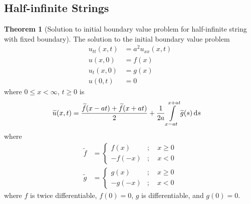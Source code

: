 \documentclass[titlepage, fleqn, a4paper, 12pt, twoside]{article}
\theoremstyle{definition}
\theoremstyle{theorem}
\newtheorem{theorem}{Theorem}
\renewcommand{\tilde}{\widetilde}
\begin{document}
\subsection{Half-infinite Strings}

\begin{theorem}[Solution to initial boundary value problem for half-infinite string with fixed boundary]
	The solution to the initial boundary value problem
	\begin{align*}
		u_{t t}(x,t) & = a^2 u_{x x}(x,t) \\
		u(x,0)       & = f(x)             \\
		u_t(x,0)     & = g(x)             \\
		u(0,t)       & = 0
	\end{align*}
	where $0 \le x < \infty$, $t \ge 0$ is
	\begin{align*}
		\tilde{u}(x,t) & = \frac{\tilde{f}(x - a t) + \tilde{f}(x + a t)}{2} + \frac{1}{2 a} \int\limits_{x - a t}^{x + a t} \tilde{g}(s) \dif s
	\end{align*}
	where
	\begin{align*}
		\tilde{f} &=
			\begin{cases}
				f(x)   & ;\quad x \ge 0 \\
				-f(-x) & ;\quad x < 0
			\end{cases}\\
		\tilde{g} &=
			\begin{cases}
				g(x)   & ;\quad x \ge 0 \\
				-g(-x) & ;\quad x < 0
			\end{cases}
	\end{align*}
	where $f$ is twice differentiable, $f(0) = 0$, $g$ is differentiable, and $g(0) = 0$.
	\label{thm:Solution_to_initial_boundary_value_problem_for_half-infinite_string_with_fixed_boundary}
\end{theorem}
\end{document}
